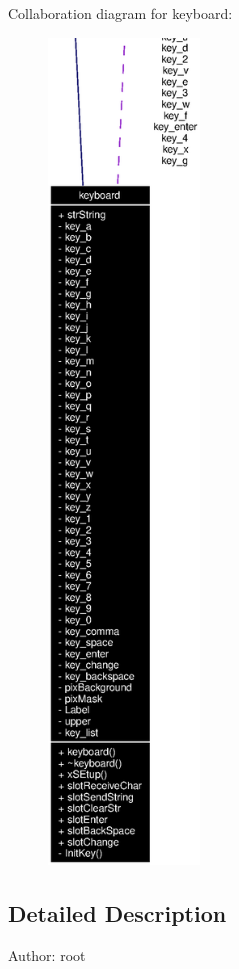 Collaboration diagram for keyboard:\begin{figure}[H]
\begin{center}
\leavevmode
\includegraphics[width=114pt]{classkeyboard__coll__graph}
\end{center}
\end{figure}


\subsection{Detailed Description}
\begin{Desc}
\item[Author:]root \end{Desc}




